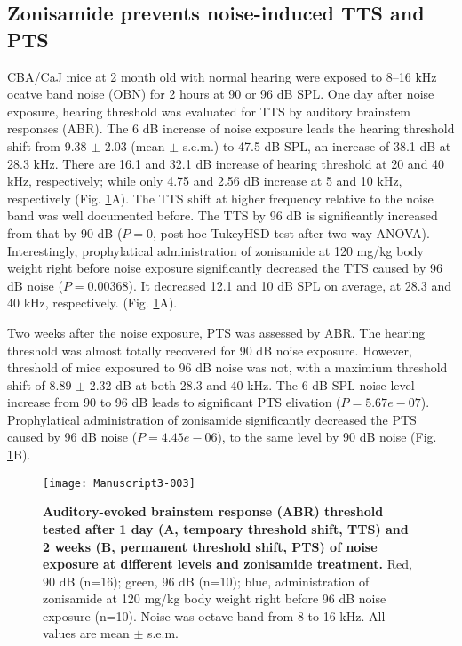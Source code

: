 \documentclass[11pt]{article}
\begin{document}
\subsection {Zonisamide prevents noise-induced TTS and PTS}




CBA/CaJ mice at 2 month old with normal hearing were exposed to 8--16 kHz ocatve band noise (OBN) for 2 hours at 90 or 96 dB SPL. One day after noise exposure, hearing threshold was evaluated for TTS by auditory brainstem responses (ABR). The 6 dB increase of noise exposure leads the hearing threshold shift from 
9.38 
$\pm$ 
2.03 
(mean $\pm$ s.e.m.) to 
47.5 dB SPL, an increase of 38.1 
dB at 28.3 kHz. There are 
16.1 
and 
32.1 
dB increase of hearing threshold at 20 and 40 kHz, respectively; while only 
4.75 
and 
2.56 
dB increase at 5 and 10 kHz, respectively (Fig. \ref{fig:Figure1}A). The TTS shift at higher frequency relative to the noise band was well documented before. The TTS by 96 dB is significantly increased from that by 90 dB 
($P = 0$, post-hoc TukeyHSD test after two-way ANOVA). 
Interestingly, prophylatical administration of zonisamide at 120 mg/kg body weight right before noise exposure significantly decreased the TTS caused by 96 dB noise 
($P = 0.00368$). It decreased 12.1 and 10 dB SPL on average, at 28.3 and 40 kHz, respectively.
(Fig. \ref{fig:Figure1}A).

Two weeks after the noise exposure, PTS was assessed by ABR. The hearing threshold was almost totally recovered for 90 dB noise exposure. However, threshold of mice exposured to 96 dB noise was not, with a maximium threshold shift of 8.89 $\pm$ 2.32 dB at both 28.3 and 40 kHz. The 6 dB SPL noise level increase from 90 to 96 dB leads to significant PTS elivation 
($P = 5.67e-07 $).
Prophylatical administration of zonisamide significantly decreased the PTS caused by 96 dB noise 
($P = 4.45e-06 $), to the same level by 90 dB noise (Fig. \ref{fig:Figure1}B).



\begin{figure}[ht!]
\centering
\texttt{[image: Manuscript3-003]}

\caption{{\bf {Auditory-evoked brainstem response (ABR) threshold tested after 1 day (A, tempoary threshold shift, TTS) and 2 weeks (B, permanent threshold shift, PTS) of noise exposure at different levels and zonisamide treatment.}} Red, 90 dB (n=16); green, 96 dB (n=10); blue, administration of zonisamide at 120 mg/kg body weight right before 96 dB noise exposure (n=10). Noise was octave band from 8 to 16 kHz. All values are mean $\pm$ s.e.m.}
\label{fig:Figure1}
\end{figure}
\end{document}
